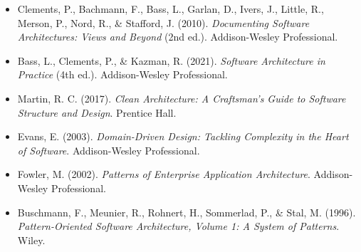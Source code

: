 \documentclass[11pt]{article}
\begin{document}
\begin{itemize}
  \item Clements, P., Bachmann, F., Bass, L., Garlan, D., Ivers, J., Little, R., Merson, P., Nord, R., \& Stafford, J. (2010). \textit{Documenting Software Architectures: Views and Beyond} (2nd ed.). Addison-Wesley Professional.
  \item Bass, L., Clements, P., \& Kazman, R. (2021). \textit{Software Architecture in Practice} (4th ed.). Addison-Wesley Professional.
  \item Martin, R. C. (2017). \textit{Clean Architecture: A Craftsman's Guide to Software Structure and Design}. Prentice Hall.
  \item Evans, E. (2003). \textit{Domain-Driven Design: Tackling Complexity in the Heart of Software}. Addison-Wesley Professional.
  \item Fowler, M. (2002). \textit{Patterns of Enterprise Application Architecture}. Addison-Wesley Professional.
  \item Buschmann, F., Meunier, R., Rohnert, H., Sommerlad, P., \& Stal, M. (1996). \textit{Pattern-Oriented Software Architecture, Volume 1: A System of Patterns}. Wiley.
\end{itemize}

\listoffigures
\end{document}
